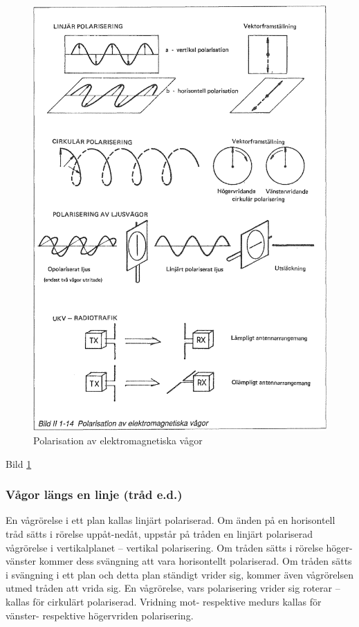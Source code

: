 \begin{figure}
  \includegraphics[width=\textwidth]{images/bild_2_1-14}
  \caption{Polarisation av elektromagnetiska vågor}
  \label{fig:BildII1-14}
\end{figure}

Bild \ref{fig:BildII1-14}

\subsubsection{Vågor längs en linje (tråd e.d.)}
En vågrörelse i ett plan kallas linjärt polariserad. Om änden på en horisontell
tråd sätts i rörelse uppåt-nedåt, uppstår på tråden en linjärt polariserad
vågrörelse i vertikalplanet -- vertikal polarisering.
Om tråden sätts i rörelse höger-vänster kommer dess svängning att vara
horisontellt polariserad.
Om tråden sätts i svängning i ett plan och detta plan ständigt vrider sig,
kommer även vågrörelsen utmed tråden att vrida sig. En vågrörelse, vars
polarisering vrider sig roterar -- kallas för cirkulärt polariserad. Vridning
mot- respektive medurs kallas för vänster- respektive högervriden polarisering.

